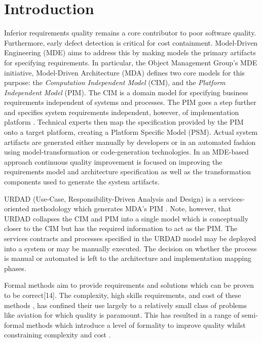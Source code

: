 \section{Introduction}\label{sec:Introduction}

Inferior requirements quality remains a core contributor to poor software quality\cite{heck_experiences_2008,_strategies_2011}. Furthermore, early defect detection is critical for cost containment\cite{betterReferenceThanBoehm1981WhichReliesOnWaterfall}. Model-Driven Engineering (MDE) \cite{frankel_model_2003} aims to address this by making models the primary artifacts for specifying requirements. In particular, the Object Management Group's MDE initiative, Model-Driven Architecture (MDA) defines two core models for this purpose: the \emph{Computation Independent Model} (CIM), and the \emph{Platform Independent Model} (PIM). The CIM is a domain model for specifying business requirements independent of systems and processes. The PIM goes a step further and specifies system requirements independent, however, of implementation platform \cite{needAGoodCitation}. Technical experts then map the specification provided by the PIM onto a target platform, creating a {Platform Specific Model} (PSM).  Actual system artifacts are generated either manually by developers or in an automated fashion using model-transformation or code-generation technologies. In an MDE-based approach continuous quality improvement is focused on improving the requirements model and architecture specification as well as the transformation components used to generate the system artifacts.

URDAD (Use-Case, Responsibility-Driven Analysis and Design) \cite{solms_technology_2007} is a services-oriented methodology which generates MDA's PIM \cite{solms_generating_2009}. Note, however, that URDAD collapses the CIM and PIM into a single model which is conceptually closer to the CIM but has the required information to act as the PIM. The services contracts and processes specified in the URDAD model may be deployed into a system or may be manually executed. The decision on whether the process is manual or automated is left to the architecture and implementation mapping phases. 

Formal methods aim to provide requirements and solutions which can be proven to be correct[14]. The complexity, high skills requirements, and cost of these methods \cite{}, has confined their use largely to a relatively small class of problems like aviation \cite{Hall} for which quality is paramount. This has resulted in a range of semi-formal methods which introduce a level of formality to improve quality whilst constraining complexity and cost \cite{}.

